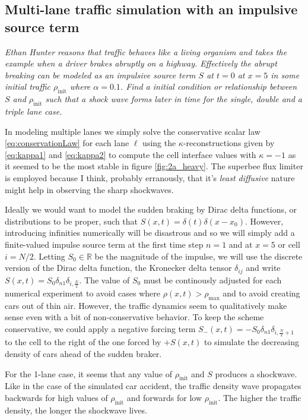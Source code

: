 \documentclass[11pt]{article}
\begin{document}
\subsection{Multi-lane traffic simulation with an impulsive source term}
\begin{tcolorbox}
  \textit{Ethan Hunter reasons that traffic behaves like a living organism and takes the example when a driver brakes abruptly on a highway. Effectively the abrupt breaking can be modeled as an impulsive source term $S$ at $t = 0$ at $x = 5$ in some initial traffic $\rho_\mathrm{init}$ where $\alpha = 0.1$. Find a initial condition or relationship between $S$ and $\rho_\mathrm{init}$ such that a shock wave forms later in time for the single, double and a triple lane case.}
\end{tcolorbox}

In modeling multiple lanes we simply solve the conservative scalar law \eqref{eq:conservationLaw} for each lane $\ell$ using the $\kappa$-reconstructions given by \eqref{eq:kappa1} and \eqref{eq:kappa2} to compute the cell interface values with $\kappa=-1$ as it seemed to be the most stable in figure \ref{fig:2a_heavy}. The superbee flux limiter is employed because I think, probably erranously, that it's \emph{least diffusive} nature might help in observing the sharp shockwaves. 

Ideally we would want to model the sudden braking by Dirac delta functions, or distributions to be proper, such that $S(x,t) = \delta(t)\delta(x-x_0)$. However, introducing infinities numerically will be disastrous and so we will simply add a finite-valued impulse source term at the first time step $n=1$ and at $x=5$ or cell $i=N/2$. Letting $S_0 \in \mathbb{R}$ be the magnitude of the impulse, we will use the discrete version of the Dirac delta function, the Kronecker delta tensor $\delta_{ij}$ and write $S(x,t) = S_0\delta_{n1}\delta_{i,\frac{N}{2}}$. The value of $S_0$ must be continously adjusted for each numerical experiment to avoid cases where $\rho(x,t) > \rho_\mathrm{max}$ and to avoid creating cars out of thin air. However, the traffic dynamics seem to qualitatively make sense even with a bit of non-conservative behavior. To keep the scheme conservative, we could apply a negative forcing term $S_{-}(x,t) = -S_0\delta_{n1}\delta_{i,\frac{N}{2}+1}$ to the cell to the right of the one forced by $+S(x,t)$ to simulate the decreasing density of cars ahead of the sudden braker.

For the 1-lane case, it seems that any value of $\rho_\mathrm{init}$ and $S$ produces a shockwave. Like in the case of the simulated car accident, the traffic density wave propagates backwards for high values of $\rho_\mathrm{init}$ and forwards for low $\rho_\mathrm{init}$. The higher the traffic density, the longer the shockwave lives.
\end{document}
